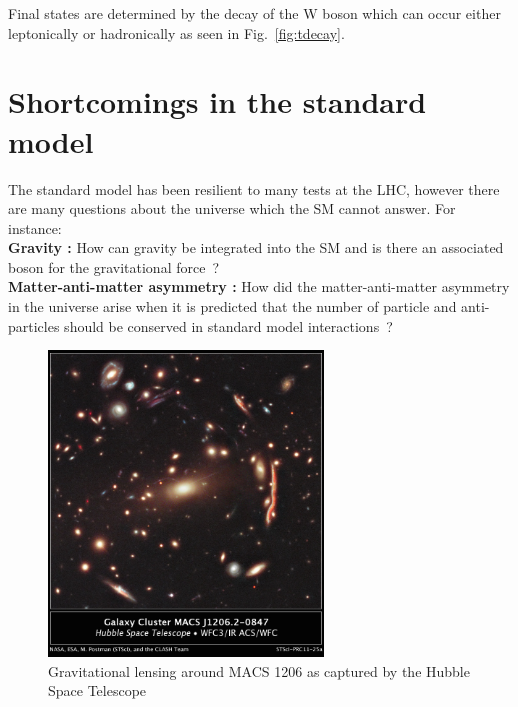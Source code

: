 Final states are determined by the decay of the W boson which can occur either leptonically or hadronically as seen in Fig.~\ref{fig:tdecay}. 


\section{Shortcomings in the standard model}
The standard model has been resilient to many tests at the LHC, however there are many questions about the universe which the SM cannot answer. For instance:\\
{\bf Gravity :} How can gravity be integrated into the SM and is there an associated boson for the gravitational force~\cite{PhysRevLett.107.171101,PhysRevD.82.122001}? \\
{\bf Matter-anti-matter asymmetry :} How did the matter-anti-matter asymmetry in the universe arise when it is predicted that the number of particle and anti-particles should be conserved in standard model interactions~\cite{RevModPhys.76.1}?\\
\begin{figure}[ht!]
\centering
    \includegraphics[width=0.65\textwidth]{images/Theory/lensing2.jpg}
    \caption{Gravitational lensing around MACS 1206 as captured by the Hubble Space Telescope~\cite{Glens}}
    \label{fig:Glens}
\end{figure}

